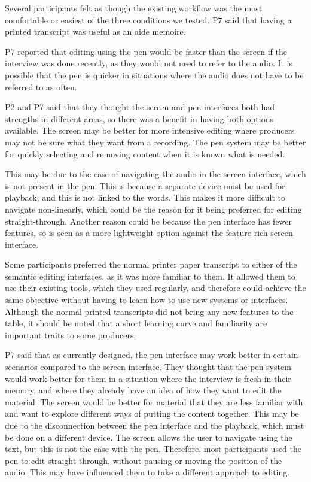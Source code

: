 
Several participants felt as though the existing workflow was the most comfortable or easiest of the three conditions
we tested. P7 said that having a printed transcript was useful as an aide memoire.

P7 reported that editing using the pen would be faster than the screen if the interview was done recently, as they
would not need to refer to the audio. It is possible that the pen is quicker in situations where the audio does not
have to be referred to as often.

P2 and P7 said that they thought the screen and pen interfaces both had strengths in different areas, so there was a
benefit in having both options available. The screen may be better for more intensive editing where producers may not
be sure what they want from a recording. The pen system may be better for quickly selecting and removing content when
it is known what is needed.

This may be due to the ease of navigating the audio in the screen interface, which is not present in the pen. This is
because a separate device must be used for playback, and this is not linked to the words. This makes it more difficult
to navigate non-linearly, which could be the reason for it being preferred for editing straight-through. Another reason
could be because the pen interface has fewer features, so is seen as a more lightweight option against the feature-rich
screen interface.

Some participants preferred the normal printer paper transcript to either of the semantic editing interfaces, as it was
more familiar to them. It allowed them to use their existing tools, which they used regularly, and therefore could
achieve the same objective without having to learn how to use new systems or interfaces. Although the normal printed
transcripts did not bring any new features to the table, it should be noted that a short learning curve and familiarity
are important traits to some producers.

P7 said that as currently designed, the pen interface may work better in certain scenarios compared to the screen
interface. They thought that the pen system would work better for them in a situation where the interview is fresh in
their memory, and where they already have an idea of how they want to edit the material. The screen would be better for
material that they are less familiar with and want to explore different ways of putting the content together. This may
be due to the disconnection between the pen interface and the playback, which must be done on a different device. The
screen allows the user to navigate using the text, but this is not the case with the pen. Therefore, most participants
used the pen to edit straight through, without pausing or moving the position of the audio. This may have influenced
them to take a different approach to editing.


